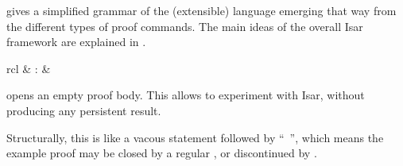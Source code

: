 \begin{isabellebody}
\begin{isamarkuptext}
   gives a simplified grammar of the (extensible)
  language emerging that way from the different types of proof
  commands.  The main ideas of the overall Isar framework are
  explained in .%
\end{isamarkuptext}%
\isamarkuptrue%
%
\isamarkuptrue%
%
\isamarkuptrue%
%
\begin{isamarkuptext}%
\begin{matharray}{rcl}
    \hypertarget{command.example-proof}{\hyperlink{command.example-proof}{\mbox{}}} & : &  \\
  \end{matharray}

  \begin{description}

  \item \hyperlink{command.example-proof}{\mbox{}} opens an empty proof body.  This
  allows to experiment with Isar, without producing any persistent
  result.

  Structurally, this is like a vacous \hyperlink{command.lemma}{\mbox{}} statement
  followed by ``\hyperlink{command.proof}{\mbox{}}~\isa{{\isachardoublequote}{\isacharminus}{\isachardoublequote}}'', which means the
  example proof may be closed by a regular \hyperlink{command.qed}{\mbox{}}, or
  discontinued by \hyperlink{command.oops}{\mbox{}}.


\end{description}
\end{isamarkuptext}
\end{isabellebody}
